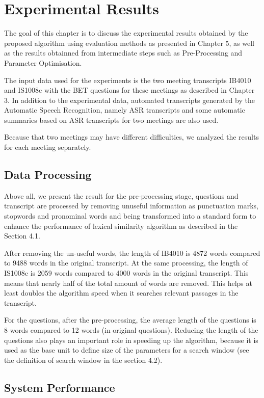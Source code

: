 \chapter{Experimental Results}
The goal of this chapter is to discuss the experimental results obtained by the proposed algorithm using evaluation methods as presented in  Chapter 5, as well as the results obtainned from intermediate steps such as Pre-Processing and Parameter Optimisation. 

The input data used for the experiments is the two meeting transcripts IB4010 and IS1008c with the BET questions for these meetings as described in Chapter 3. In addition to the experimental data, automated transcripts generated by the Automatic Speech Recognition, namely ASR transcripts and some automatic summaries based on ASR transcripts for two meetings are also used. 

Because that two meetings may have different difficulties, we analyzed the results for each meeting separately.

\section{Data Processing}


Above all, we present the result for the pre-processing stage, questions and transcript are processed by removing unuseful information as punctuation marks, stopwords and pronominal words and being transformed into a standard form to enhance the performance of lexical similarity algorithm as described in the Section 4.1.

After removing the un-useful words, the length of IB4010 is 4872 words compared to 9488 words in the original transcript. At the same processing, the length of IS1008c is 2059 words compared to 4000 words in the original transcript. This means that nearly half of the total amount of words are removed. This helps at least doubles the algorithm speed when it searches relevant passages in the transcript.

For the questions, after the pre-processing, the average length of the questions is 8 words compared to 12 words (in original questions). Reducing the length of the questions also plays an important role in speeding up the algorithm, because it is used as the base unit to define size of the parameters for a search window (see the definition of search window in the section 4.2).

\section{System Performance}


